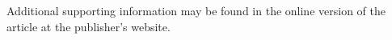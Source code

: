 \documentclass[AMA,Times1COL]{WileyNJDv5} %
\begin{document}

Additional supporting information may be found in the
online version of the article at the publisher’s website.




\end{document}
